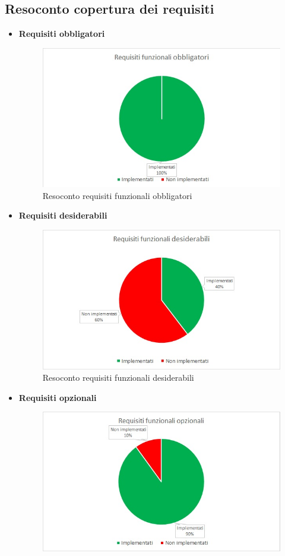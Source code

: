 \subsection{Resoconto copertura dei requisiti}
\begin{itemize}
	\item \textbf{Requisiti obbligatori}
	\begin{figure} [H]
		\centering
		\includegraphics[scale=1]{Img/R0}
		\caption{Resoconto requisiti funzionali obbligatori}
	\end{figure}
	\item \textbf{Requisiti desiderabili}
	\begin{figure} [H]
		\centering
		\includegraphics[scale=1]{Img/R1}
		\caption{Resoconto requisiti funzionali desiderabili}
	\end{figure}
\newpage
	\item \textbf{Requisiti opzionali}
	\begin{figure} [H]
		\centering
		\includegraphics[scale=1]{Img/R2}

\end{figure}
\end{itemize}
